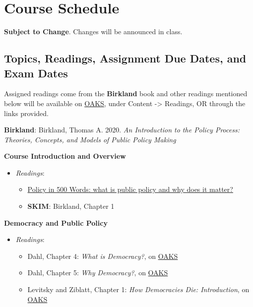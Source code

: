 \hypertarget{course-schedule}{%
\section{Course Schedule}\label{course-schedule}}

\textbf{Subject to Change}. Changes will be announced in class.

\hypertarget{topics-readings-assignment-due-dates-and-exam-dates}{%
\subsection{Topics, Readings, Assignment Due Dates, and Exam
Dates}\label{topics-readings-assignment-due-dates-and-exam-dates}}

Assigned readings come from the \textbf{Birkland} book and other
readings mentioned below will be available on
\href{https://lms.cofc.edu}{OAKS}, under Content -\textgreater{}
Readings, OR through the links provided.

\vspace{0.10in}

\noindent \textbf{Birkland}: Birkland, Thomas A. 2020. \emph{An
Introduction to the Policy Process: Theories, Concepts, and Models of
Public Policy Making}

\SetDate[04/01/2022]

\week \textbf{Course Introduction and Overview}

\begin{itemize}

\item
  \emph{Readings}:

  \begin{itemize}
  
  \item
    \href{https://paulcairney.wordpress.com/2016/04/28/policy-in-500-words-what-is-public-policy-and-why-does-it-matter/}{Policy
    in 500 Words: what is public policy and why does it matter?}
  \item
    \textbf{SKIM}: Birkland, Chapter 1
  \end{itemize}
\end{itemize}

\week \textbf{Democracy and Public Policy}

\begin{itemize}

\item
  \emph{Readings}:

  \begin{itemize}
  
  \item
    Dahl, Chapter 4: \emph{What is Democracy?}, on
    \href{https://lms.cofc.edu}{OAKS}
  \item
    Dahl, Chapter 5: \emph{Why Democracy?}, on
    \href{https://lms.cofc.edu}{OAKS}
  \item
    Levitsky and Ziblatt, Chapter 1: \emph{How Democracies Die:
    Introduction}, on \href{https://lms.cofc.edu}{OAKS}
  \end{itemize}
\end{itemize}

